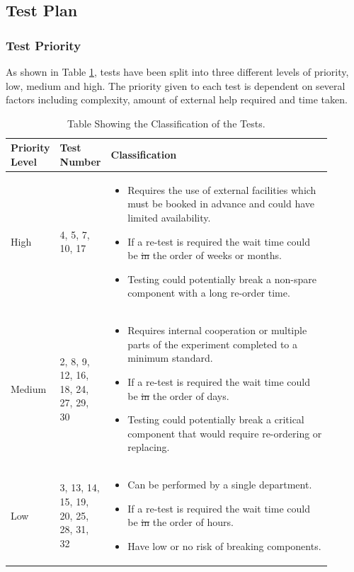 \documentclass[a4paper,12pt,oneside]{article} %
\providecommand{\DIFaddtex}[1]{{\protect\color{blue}\uwave{#1}}} %
\providecommand{\DIFdeltex}[1]{{\protect\color{red}\sout{#1}}}                      %
\providecommand{\DIFaddend}{} %
\providecommand{\DIFaddFL}[1]{\DIFadd{#1}} %
\providecommand{\DIFdelFL}[1]{\DIFdel{#1}} %
\providecommand{\DIFaddbeginFL}{} %
\providecommand{\DIFaddendFL}{} %
\providecommand{\DIFdelbeginFL}{} %
\providecommand{\DIFdelendFL}{} %
\providecommand{\DIFadd}[1]{\texorpdfstring{\DIFaddtex{#1}}{#1}} %
\providecommand{\DIFdel}[1]{\texorpdfstring{\DIFdeltex{#1}}{}} %
\newcommand{\DIFscaledelfig}{0.5}
\newlength{\DIFdelgraphicswidth} %
\newlength{\DIFdelgraphicsheight} %
\newcommand{\DIFaddincludegraphics}[2][]{{\color{blue}\fbox{\DIFOincludegraphics[#1]{#2}}}} %
\newcommand{\DIFdelincludegraphics}[2][]{%
\sbox{\DIFdelgraphicsbox}{\DIFOincludegraphics[#1]{#2}}%
\settoboxwidth{\DIFdelgraphicswidth}{\DIFdelgraphicsbox} %
\settoboxtotalheight{\DIFdelgraphicsheight}{\DIFdelgraphicsbox} %
\scalebox{\DIFscaledelfig}{%
\parbox[b]{\DIFdelgraphicswidth}{\usebox{\DIFdelgraphicsbox}\\[-\baselineskip] \rule{\DIFdelgraphicswidth}{0em}}\llap{\resizebox{\DIFdelgraphicswidth}{\DIFdelgraphicsheight}{%
\setlength{\unitlength}{\DIFdelgraphicswidth}%
\begin{picture}(1,1)%
\thicklines\linethickness{2pt} %
{\color[rgb]{1,0,0}\put(0,0){\framebox(1,1){}}}%
{\color[rgb]{1,0,0}\put(0,0){\line( 1,1){1}}}%
{\color[rgb]{1,0,0}\put(0,1){\line(1,-1){1}}}%
\end{picture}%
}\hspace*{3pt}}} %
} %
\DeclareRobustCommand{\DIFaddend}{\DIFOaddend \let\includegraphics\DIFOincludegraphics} %
\DeclareRobustCommand{\DIFaddbeginFL}{\DIFOaddbeginFL \let\includegraphics\DIFaddincludegraphics} %
\DeclareRobustCommand{\DIFaddendFL}{\DIFOaddendFL \let\includegraphics\DIFOincludegraphics} %
\DeclareRobustCommand{\DIFdelbeginFL}{\DIFOdelbeginFL \let\includegraphics\DIFdelincludegraphics} %
\DeclareRobustCommand{\DIFdelendFL}{\DIFOaddendFL \let\includegraphics\DIFOincludegraphics} %
\begin{document}
\DIFaddend \pagebreak
\subsection{Test Plan}

\subsubsection{Test Priority} \label{sec:5.2.1-testpriority}
As shown in Table \ref{tab:classification}, tests have been split into three different levels of priority, low, medium and high. The priority given to each test is dependent on several factors including complexity, amount of external help required and time taken. 

\begin{table}[H]
\centering
\begin{tabular}{|p{0.1\linewidth}|p{0.1\linewidth}|p{0.7\linewidth}|}
\hline
\textbf{Priority Level} & \textbf{Test Number} & \textbf{Classification} \\ \hline
High & 4, 5, 7, 10, 17 & \begin{itemize}
    \item Requires the use of external facilities which must be booked in advance and could have limited availability.
    \item If a re-test is required the wait time could be \DIFdelbeginFL \DIFdelFL{in }\DIFdelendFL \DIFaddbeginFL \DIFaddFL{on }\DIFaddendFL the order of weeks or months.
    \item Testing could potentially break a non-spare component with a long re-order time.
\end{itemize}\\ \hline
Medium & 2, 8, 9, 12, 16, 18, 24, 27, 29, 30 & \begin{itemize}
    \item Requires internal cooperation or multiple parts of the experiment completed to a minimum standard.
    \item If a re-test is required the wait time could be \DIFdelbeginFL \DIFdelFL{in }\DIFdelendFL \DIFaddbeginFL \DIFaddFL{on }\DIFaddendFL the order of days.
    \item Testing could potentially break a critical component that would require re-ordering or replacing.
\end{itemize} \\ \hline
Low & 3, 13, 14, 15, 19, 20, 25, 28, 31, 32 & \begin{itemize}
    \item Can be performed by a single department.
    \item If a re-test is required the wait time could be \DIFdelbeginFL \DIFdelFL{in }\DIFdelendFL \DIFaddbeginFL \DIFaddFL{on }\DIFaddendFL the order of hours.
    \item Have low or no risk of breaking components.
\end{itemize} \\ \hline
\end{tabular}
\caption{Table Showing the Classification of the Tests.}
\label{tab:classification}
\end{table}
\end{document}
